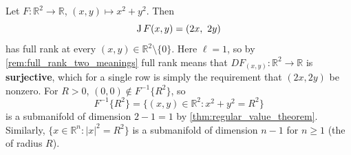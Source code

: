 \begin{example}
Let $F : \mathbb{R}^2 \to \mathbb{R}$, $(x,y) \mapsto x^2+y^2$. Then
\[\operatorname{J} F(x,y) = (2x,\ 2y)\]
has full rank at every $(x,y) \in \mathbb{R}^2\setminus\{0\}$. Here $\ell = 1$, so by
\cref{rem:full_rank_two_meanings} full rank means that $DF_{(x,y)} : \mathbb{R}^2 \to \mathbb{R}$
is \textbf{surjective}, which for a single row is simply the requirement that $(2x,2y)$ be
nonzero. For $R>0$, $(0,0) \notin F^{-1}\{R^2\}$, so
\[F^{-1}\{R^2\} = \{(x,y) \in \mathbb{R}^2 : x^2+y^2=R^2\}\]
is a submanifold of dimension $2-1=1$ by \cref{thm:regular_value_theorem}. Similarly,
$\{x \in \mathbb{R}^n : |x|^2=R^2\}$ is a submanifold of dimension $n-1$ for $n \geq 1$ (the
 of radius $R$).
\end{example}

\begin{center}
\end{center}

